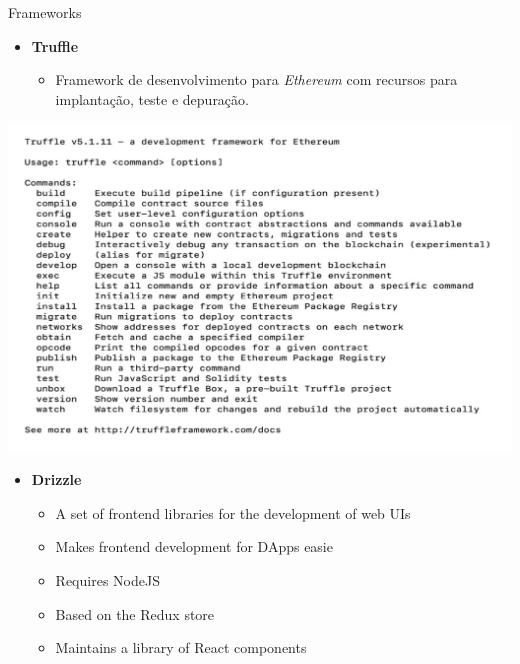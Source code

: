 \documentclass[
  pt-BR,
  ignorenonframetext,
]{beamer}
\providecommand{\tightlist}{%
  \setlength{\itemsep}{0pt}\setlength{\parskip}{0pt}}
\begin{document}
\begin{frame}[allowframebreaks]{Frameworks}
\protect\hypertarget{frameworks}{}
\begin{itemize}
\tightlist
\item
  \textbf{Truffle}

  \begin{itemize}
  \tightlist
  \item
    Framework de desenvolvimento para \emph{Ethereum} com recursos para
    implantação, teste e depuração.
  \end{itemize}
\end{itemize}

\includegraphics{figuras/truffle-interface.pdf}

\begin{itemize}
\tightlist
\item
  \textbf{Drizzle}

  \begin{itemize}
  \tightlist
  \item
    A set of frontend libraries for the development of web UIs
  \item
    Makes frontend development for DApps easie
  \item
    Requires NodeJS
  \item
    Based on the Redux store
  \item
    Maintains a library of React components
  \end{itemize}
\end{itemize}
\end{frame}
\end{document}

